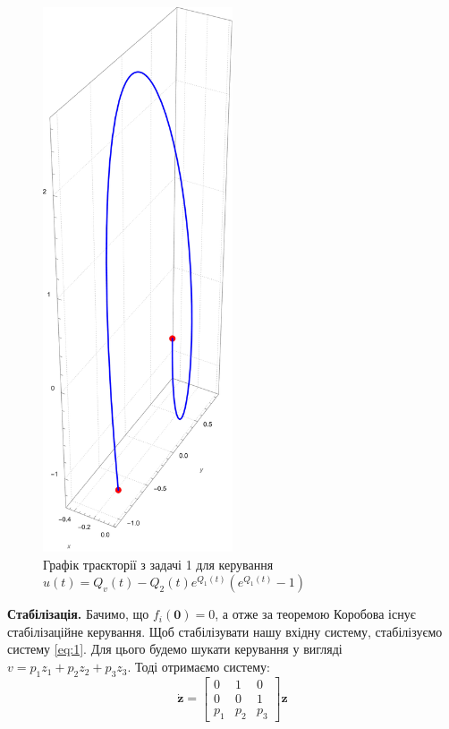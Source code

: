 \documentclass[oneside,solution]{karazin-control-assign}
\begin{document}
\begin{figure}
    \centering
    \includegraphics[width=0.5\textwidth]{test_3_problem_1.pdf}
    \caption{Графік траєкторії з задачі 1 для керування $u(t) = Q_v(t) - Q_2(t)e^{Q_1(t)}(e^{Q_1(t)}-1)$}
    \label{fig:problem_1}
\end{figure}

\textbf{Стабілізація.} Бачимо, що $f_i(\mathbf{0})=0$, а отже за теоремою Коробова існує стабілізаційне керування. Щоб стабілізувати нашу вхідну систему, стабілізуємо систему \ref{eq:1}. Для цього будемо шукати керування у вигляді $v=p_1z_1+p_2z_2+p_3z_3$. Тоді отримаємо систему:
\begin{equation}
    \dot{\mathbf{z}} = \begin{bmatrix}
        0 & 1 & 0 \\
        0 & 0 & 1 \\
        p_1 & p_2 & p_3
    \end{bmatrix}\mathbf{z}
\end{equation}
\end{document}
